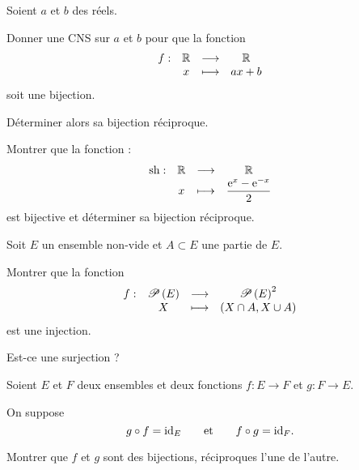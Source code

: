 \begin{corr}
\end{corr}

\begin{exo}
Soient \(a\) et \(b\) des réels.

Donner une CNS sur \(a\) et \(b\) pour que la fonction \[\begin{array}[t]{cccc}f : & \mathbb{R} & \longrightarrow & \mathbb{R} \\ & x & \longmapsto & ax+b\end{array}\] soit une bijection.

Déterminer alors sa bijection réciproque.
\end{exo}

\begin{corr}
\end{corr}

\begin{exo}
Montrer que la fonction  : \[\begin{array}[t]{cccc}\operatorname{sh} : & \mathbb{R} & \longrightarrow & \mathbb{R} \\ & x & \longmapsto & \dfrac{\mathrm{e}^{x}-\mathrm{e}^{-x}}{2}\end{array}\] est bijective et déterminer sa bijection réciproque.
\end{exo}

\begin{corr}
\end{corr}

\begin{exo}
Soit \(E\) un ensemble non-vide et \(A\subset E\) une partie de \(E\).

Montrer que la fonction \[\begin{array}[t]{cccc}f : & \mathscr{P}\left(E\right) & \longrightarrow & \mathscr{P}\left(E\right)^2 \\ & X & \longmapsto & \left(X\cap A,X\cup A\right)\end{array}\] est une injection.

Est-ce une surjection ?
\end{exo}

\begin{corr}
\end{corr}

\begin{exo}
Soient \(E\) et \(F\) deux ensembles et deux fonctions \(f:E\to F\) et \(g:F\to E\).

On suppose \[g\circ f=\mathrm{id}_{E}\qquad\text{et}\qquad f\circ g=\mathrm{id}_{F}.\]

Montrer que \(f\) et \(g\) sont des bijections, réciproques l'une de l'autre.
\end{exo}

\begin{corr}
\end{corr}

